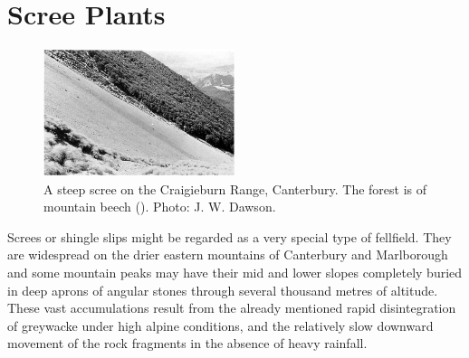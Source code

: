 \section{Scree Plants}

\begin{figure}
	\includegraphics[width=0.5\textwidth]{graphics/figure111craigieburn.jpg}
	\centering
	\caption[A steep scree on the Craigieburn Range]{A steep scree on the Craigieburn Range, Canterbury.
	The forest is of mountain beech ().
	Photo: J. W. Dawson.}%
	\label{fig:111craigieburn}
\end{figure}

Screes or shingle slips might be regarded as a very special type of fellfield.
They are widespread on the drier eastern mountains of Canterbury and Marlborough and some mountain peaks may have their mid and lower slopes completely buried in deep aprons of angular stones through several thousand metres of altitude.
These vast accumulations result from the already mentioned rapid disintegration of greywacke under high alpine conditions, and the relatively slow downward movement of the rock fragments in the absence of heavy rainfall.

